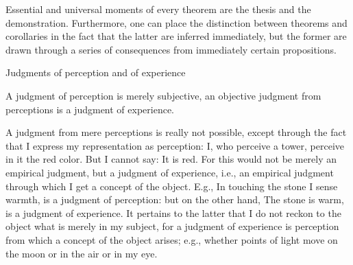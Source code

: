     Essential and universal moments of every theorem are
    the thesis and the demonstration.
    Furthermore, one can place the distinction between
    theorems and corollaries in the fact that
    the latter are inferred immediately,
    but the former are drawn through a series of
    consequences from immediately certain propositions.

Judgments of perception and of experience

A judgment of perception is merely subjective,
an objective judgment from perceptions is a judgment of experience.

    A judgment from mere perceptions is really not possible,
    except through the fact that I express my representation as perception:
    I, who perceive a tower, perceive in it the red color.
    But I cannot say: It is red.
    For this would not be merely an empirical judgment, but a judgment of experience, i.e.,
    an empirical judgment through which I get a concept of the object. E.g.,
    In touching the stone I sense warmth, is a judgment of perception:
    but on the other hand, The stone is warm, is a judgment of experience.
    It pertains to the latter that I do not reckon to the object
    what is merely in my subject, for a judgment of experience is perception
    from which a concept of the object arises;
    e.g., whether points of light move on the moon or in the air or in my eye.
